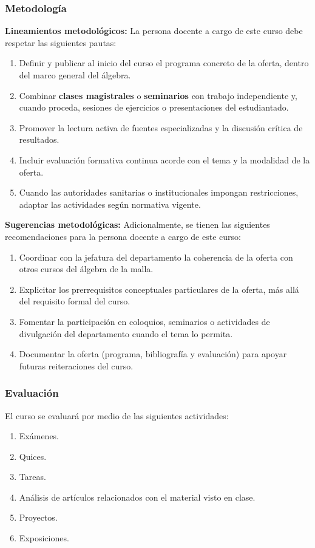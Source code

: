 \begin{refsection}
\subsubsection*{Metodología}

\noindent \textbf{Lineamientos metodológicos:} La persona docente a cargo de este curso debe respetar las siguientes pautas:

\begin{enumerate}
    \item Definir y publicar al inicio del curso el programa concreto de la oferta, dentro del marco general del álgebra.
    \item Combinar \textbf{clases magistrales} o \textbf{seminarios} con trabajo independiente y, cuando proceda, sesiones de ejercicios o presentaciones del estudiantado.
    \item Promover la lectura activa de fuentes especializadas y la discusión crítica de resultados.
    \item Incluir evaluación formativa continua acorde con el tema y la modalidad de la oferta.
    \item Cuando las autoridades sanitarias o institucionales impongan restricciones, adaptar las actividades según normativa vigente.
\end{enumerate}

\textbf{Sugerencias metodológicas:} Adicionalmente, se tienen las siguientes recomendaciones para la persona docente a cargo de este curso:

\begin{enumerate}
    \item Coordinar con la jefatura del departamento la coherencia de la oferta con otros cursos del álgebra de la malla.
    \item Explicitar los prerrequisitos conceptuales particulares de la oferta, más allá del requisito formal del curso.
    \item Fomentar la participación en coloquios, seminarios o actividades de divulgación del departamento cuando el tema lo permita.
    \item Documentar la oferta (programa, bibliografía y evaluación) para apoyar futuras reiteraciones del curso.
\end{enumerate}

\subsubsection*{Evaluación}

El curso se evaluará por medio de las siguientes actividades:

\begin{enumerate}
\item Exámenes.
\item Quices.
\item Tareas.
\item Análisis de artículos relacionados con el material visto en clase.
\item Proyectos.
\item Exposiciones.
\end{enumerate}

\end{refsection}
